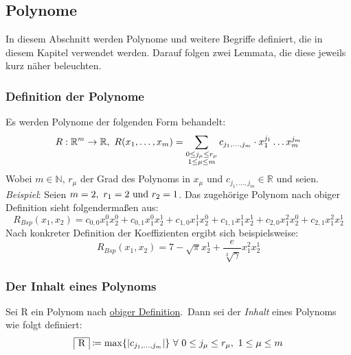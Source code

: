 
\subsection{Polynome}
    \label{subsec:polynomials}
    \textrm{In diesem Abschnitt werden Polynome und weitere Begriffe definiert, die in diesem Kapitel verwendet werden.
    Darauf folgen zwei Lemmata, die diese jeweils kurz näher beleuchten.}
    
    \subsubsection{Definition der Polynome}
        \label{subsubsec:def-poly}
        Es werden Polynome der folgenden Form behandelt:
        \begin{equation}
            R : \mathbb{R}^m \rightarrow \mathbb{R},\
            R(x_1, \dots, x_m) = \sum_{\substack{0 \leq j_\mu \leq r_\mu \\ 1 \leq \mu \leq m}}
            c_{j_1, \dots, j_m} \cdot x_1^{j_1} \dots x_m^{j_m} \label{eq:def-poly}
        \end{equation}
        Wobei $m \in \mathbb{N}$, $r_\mu$ der Grad des Polynoms in $x_\mu$ und $c_{j_1, \dots, j_m} \in
        \mathbb{R}$ und seien.
        \newline \newline
        \emph{Beispiel}: Seien $m = 2,\ r_1 = 2 \ \textrm{und}\  r_2 = 1$.
        \newline
        \textrm{Das zugehörige Polynom nach obiger Definition sieht folgendermaßen aus:}
        \begin{equation*}
            R_{Bsp}(x_1, x_2) = c_{0,0} x_1^0 x_2^0 + c_{0,1} x_1^0 x_2^1 + c_{1,0} x_1^1 x_2^0 + c_{1,1} x_1^1
            x_2^1 + c_{2, 0} x_1^2 x_2^0 + c_{2,1} x_1^2 x_2^1
        \end{equation*}
        Nach konkreter Definition der Koeffizienten ergibt sich beispielsweise:
        \begin{equation*}
            R_{Bsp}(x_1, x_2) = 7 - \sqrt{\pi} x_2^1 + \frac{e}{\sqrt[3]{\gamma}} x_1^2 x_2^1
        \end{equation*}
    
    \subsubsection{Der Inhalt eines Polynoms}
        \label{subsubsec:def-content}
        Sei R ein Polynom nach \hyperref[subsubsec:def-poly]{obiger Definition}.\ Dann sei der \emph{Inhalt} eines
        Polynoms wie folgt definiert:
        \begin{equation}
            \content{R} \coloneq \max\{|c_{\enum{j_1}{j_m}}| \} \  \forall \  0 \leq j_\mu \leq r_\mu, \
            1 \leq \mu \leq m \label{eq:def-content}
        \end{equation}
    
